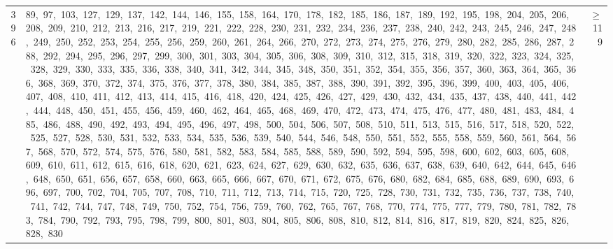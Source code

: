 \begin{longtable}{c|p{}|r}
396 & 89,\ 97,\ 103,\ 127,\ 129,\ 137,\ 142,\ 144,\ 146,\ 155,\ 158,\ 164,\ 170,\ 178,\ 182,\ 185,\ 186,\ 187,\ 189,\ 192,\ 195,\ 198,\ 204,\ 205,\ 206,\ 208,\ 209,\ 210,\ 212,\ 213,\ 216,\ 217,\ 219,\ 221,\ 222,\ 228,\ 230,\ 231,\ 232,\ 234,\ 236,\ 237,\ 238,\ 240,\ 242,\ 243,\ 245,\ 246,\ 247,\ 248,\ 249,\ 250,\ 252,\ 253,\ 254,\ 255,\ 256,\ 259,\ 260,\ 261,\ 264,\ 266,\ 270,\ 272,\ 273,\ 274,\ 275,\ 276,\ 279,\ 280,\ 282,\ 285,\ 286,\ 287,\ 288,\ 292,\ 294,\ 295,\ 296,\ 297,\ 299,\ 300,\ 301,\ 303,\ 304,\ 305,\ 306,\ 308,\ 309,\ 310,\ 312,\ 315,\ 318,\ 319,\ 320,\ 322,\ 323,\ 324,\ 325,\ 328,\ 329,\ 330,\ 333,\ 335,\ 336,\ 338,\ 340,\ 341,\ 342,\ 344,\ 345,\ 348,\ 350,\ 351,\ 352,\ 354,\ 355,\ 356,\ 357,\ 360,\ 363,\ 364,\ 365,\ 366,\ 368,\ 369,\ 370,\ 372,\ 374,\ 375,\ 376,\ 377,\ 378,\ 380,\ 384,\ 385,\ 387,\ 388,\ 390,\ 391,\ 392,\ 395,\ 396,\ 399,\ 400,\ 403,\ 405,\ 406,\ 407,\ 408,\ 410,\ 411,\ 412,\ 413,\ 414,\ 415,\ 416,\ 418,\ 420,\ 424,\ 425,\ 426,\ 427,\ 429,\ 430,\ 432,\ 434,\ 435,\ 437,\ 438,\ 440,\ 441,\ 442,\ 444,\ 448,\ 450,\ 451,\ 455,\ 456,\ 459,\ 460,\ 462,\ 464,\ 465,\ 468,\ 469,\ 470,\ 472,\ 473,\ 474,\ 475,\ 476,\ 477,\ 480,\ 481,\ 483,\ 484,\ 485,\ 486,\ 488,\ 490,\ 492,\ 493,\ 494,\ 495,\ 496,\ 497,\ 498,\ 500,\ 504,\ 506,\ 507,\ 508,\ 510,\ 511,\ 513,\ 515,\ 516,\ 517,\ 518,\ 520,\ 522,\ 525,\ 527,\ 528,\ 530,\ 531,\ 532,\ 533,\ 534,\ 535,\ 536,\ 539,\ 540,\ 544,\ 546,\ 548,\ 550,\ 551,\ 552,\ 555,\ 558,\ 559,\ 560,\ 561,\ 564,\ 567,\ 568,\ 570,\ 572,\ 574,\ 575,\ 576,\ 580,\ 581,\ 582,\ 583,\ 584,\ 585,\ 588,\ 589,\ 590,\ 592,\ 594,\ 595,\ 598,\ 600,\ 602,\ 603,\ 605,\ 608,\ 609,\ 610,\ 611,\ 612,\ 615,\ 616,\ 618,\ 620,\ 621,\ 623,\ 624,\ 627,\ 629,\ 630,\ 632,\ 635,\ 636,\ 637,\ 638,\ 639,\ 640,\ 642,\ 644,\ 645,\ 646,\ 648,\ 650,\ 651,\ 656,\ 657,\ 658,\ 660,\ 663,\ 665,\ 666,\ 667,\ 670,\ 671,\ 672,\ 675,\ 676,\ 680,\ 682,\ 684,\ 685,\ 688,\ 689,\ 690,\ 693,\ 696,\ 697,\ 700,\ 702,\ 704,\ 705,\ 707,\ 708,\ 710,\ 711,\ 712,\ 713,\ 714,\ 715,\ 720,\ 725,\ 728,\ 730,\ 731,\ 732,\ 735,\ 736,\ 737,\ 738,\ 740,\ 741,\ 742,\ 744,\ 747,\ 748,\ 749,\ 750,\ 752,\ 754,\ 756,\ 759,\ 760,\ 762,\ 765,\ 767,\ 768,\ 770,\ 774,\ 775,\ 777,\ 779,\ 780,\ 781,\ 782,\ 783,\ 784,\ 790,\ 792,\ 793,\ 795,\ 798,\ 799,\ 800,\ 801,\ 803,\ 804,\ 805,\ 806,\ 808,\ 810,\ 812,\ 814,\ 816,\ 817,\ 819,\ 820,\ 824,\ 825,\ 826,\ 828,\ 830 & $\ge$ 119 \\

\end{longtable}
